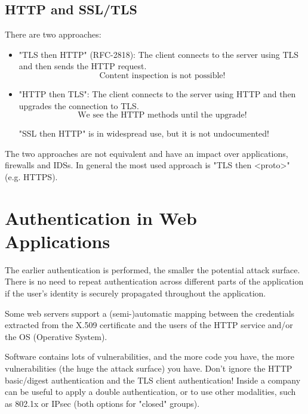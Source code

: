 \subsection{HTTP and SSL/TLS}
There are two approaches:
\begin{itemize}
    \item "TLS then HTTP" (RFC-2818): The client connects to the server using TLS and then sends the HTTP request.
    \[
        \text{Content inspection is not possible!}
    \]
    \item "HTTP then TLS": The client connects to the server using HTTP and then upgrades the connection to TLS.
    \[
        \text{We see the HTTP methods until the upgrade!}
    \]
    \begin{tcolorbox}[colback=red!10!white, colframe=red!70!black, coltitle=white, title=Beware]
    "SSL then HTTP" is in widespread use, but it is not undocumented!
    \end{tcolorbox}
\end{itemize}


\noindent The two approaches are not equivalent and have an impact over applications, firewalls and IDSs. In general the most used approach is "TLS then <proto>" (e.g. HTTPS).

\section{Authentication in Web Applications}
The earlier authentication is performed, the smaller the potential attack surface. There is no need to repeat authentication across different parts of the application if the user's identity is securely propagated throughout the application.

Some web servers support a (semi-)automatic mapping between the credentials extracted from the X.509 certificate and the users of the HTTP service and/or the OS (Operative System).
\begin{tcolorbox}[colback=red!10!white, colframe=red!70!black, coltitle=white, title=Beware]
Software contains lots of vulnerabilities, and the more code you have, the more vulnerabilities (the huge the attack surface) you have. Don't ignore the HTTP basic/digest authentication and the TLS client authentication! Inside a company can be useful to apply a double authentication, or to use other modalities, such as 802.1x or IPsec (both options for "closed" groups).
\end{tcolorbox}


